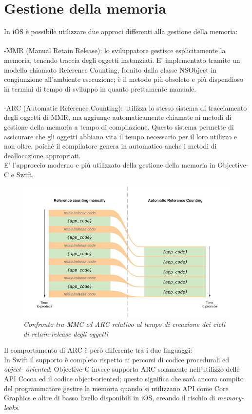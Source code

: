 \section{Gestione della memoria}
In iOS è possibile utilizzare due approci differenti alla gestione della memoria:\\
\\-MMR (Manual Retain Release): lo sviluppatore gestisce esplicitamente la memoria, tenendo traccia degli oggetti instanziati. E' implementato tramite un modello chiamato Reference Counting, fornito dalla classe NSObject in congiunzione all'ambiente esecuzione; è il metodo più obsoleto e più dispendioso in termini di tempo di sviluppo in quanto prettamente manuale.\\
\\-ARC (Automatic Reference Counting): utilizza lo stesso sistema di tracciamento degli oggetti di MMR, ma aggiunge automaticamente chiamate ai metodi di gestione della memoria a tempo di compilazione. Questo sistema permette di assicurare che gli oggetti abbiano vita il tempo necessario per il loro utilizzo e non oltre, poiché il compilatore genera in automatico anche i metodi di deallocazione appropriati.\\E' l'approccio moderno e più utilizzato della gestione della memoria in Objective-C e Swift.
\begin{figure}[H]
      \centering
      \includegraphics[scale=0.50]{immagini/ARC.jpg}
            \vspace{0.8cm}
            \caption{\textit{Confronto tra MMC ed ARC relativo al tempo di creazione dei cicli di retain-release degli oggetti}}
    \end{figure}
Il comportamento di ARC è però differente tra i due linguaggi:\\
In Swift il supporto è completo rispetto ai percorsi di codice procedurali ed \textit{object- oriented}; Objective-C invece supporta ARC solamente nell'utilizzo delle API Cocoa ed il codice object-oriented; questo significa che sarà ancora compito del programmatore gestire la memoria quando si utilizzano API come Core Graphics e altre di basso livello disponibili in iOS, creando il rischio di \textit{memory-leaks}.
